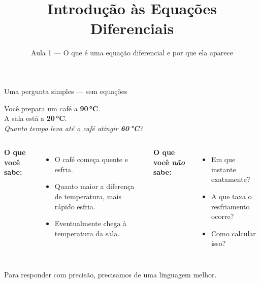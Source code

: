 \documentclass[12pt]{beamer}
\title{Introdução às Equações Diferenciais}
\subtitle{Aula 1 — O que é uma equação diferencial e por que ela aparece}
\author{}
\institute{Equações Diferenciais Ordinárias}
\date{}
\begin{document}
\begin{frame}
  \titlepage
\end{frame}


\begin{frame}{Uma pergunta simples — sem equações}

  \begin{center}
    {\large Você prepara um café a \textbf{90\,°C}.}\\[6pt]
    A sala está a \textbf{20\,°C}.\\[14pt]
    \textit{Quanto tempo leva até o café atingir \textbf{60\,°C}?}
  \end{center}

  \vfill
  \pause

  \begin{columns}[T]
      \textbf{O que você sabe:}
      \begin{itemize}
        \item O café começa quente e esfria.
        \item Quanto maior a diferença de temperatura, mais rápido esfria.
        \item Eventualmente chega à temperatura da sala.
      \end{itemize}

      \textbf{O que você \emph{não} sabe:}
      \begin{itemize}
        \item Em que instante exatamente?
        \item A que taxa o resfriamento ocorre?
        \item Como calcular isso?
      \end{itemize}
  \end{columns}

  \vfill
  \begin{alertblock}{}
    \centering
    Para responder com precisão, precisamos de uma linguagem melhor.
  \end{alertblock}

\end{frame}
\end{document}
